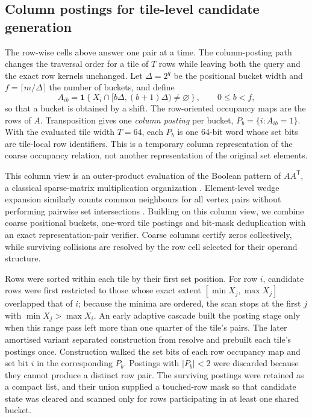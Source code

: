 \subsection*{Column postings for tile-level candidate generation}

The row-wise cells above answer one pair at a time. The column-posting path changes the traversal
order for a tile of $T$ rows while leaving both the query and the exact row kernels unchanged. Let
$\Delta=2^q$ be the positional bucket width and $f=\lceil m/\Delta\rceil$ the number of buckets, and
define
\begin{equation}
A_{ib}=\mathbf{1}\!\left\{X_i\cap[b\Delta,(b+1)\Delta)\ne\varnothing\right\},
\qquad 0\le b<f ,
\label{eq:posting-incidence}
\end{equation}
so that a bucket is obtained by a shift. The row-oriented occupancy maps are the rows of $A$.
Transposition gives one
\emph{column posting} per bucket,
$P_b=\{i:A_{ib}=1\}$. With the evaluated tile width $T=64$, each $P_b$ is one 64-bit word whose set
bits are tile-local row identifiers. This is a temporary column representation of the coarse
occupancy relation, not another representation of the original set elements.

This column view is an outer-product evaluation of the Boolean pattern of $AA^{\mathsf T}$, a
classical sparse-matrix multiplication organization \cite{gustavson1978spgemm,buluc2011combinatorialblas}.
Element-level wedge expansion similarly counts common neighbours for all vertex pairs without
performing pairwise set intersections \cite{an2019skipintersection}. Building on this column view,
we combine coarse positional buckets, one-word tile postings and bit-mask deduplication with an exact
representation-pair verifier. Coarse columns certify zeros collectively, while surviving collisions
are resolved by the row cell selected for their operand structure.

Rows were sorted within each tile by their first set position. For row $i$, candidate rows were first
restricted to those whose exact extent $[\min X_j,\max X_j]$ overlapped that of $i$; because the
minima are ordered, the scan stops at the first $j$ with $\min X_j>\max X_i$. An early adaptive
cascade built the posting stage only when this range pass left more than one quarter of the tile's
pairs. The later amortised variant separated construction from resolve and prebuilt each tile's
postings once. Construction walked the set bits of each row occupancy map and set bit $i$ in the
corresponding $P_b$. Postings with $|P_b|<2$ were discarded because they cannot produce a distinct
row pair. The surviving postings were retained as a compact list, and their union supplied a
touched-row mask so that candidate state was cleared and scanned only for rows participating in at
least one shared bucket.


